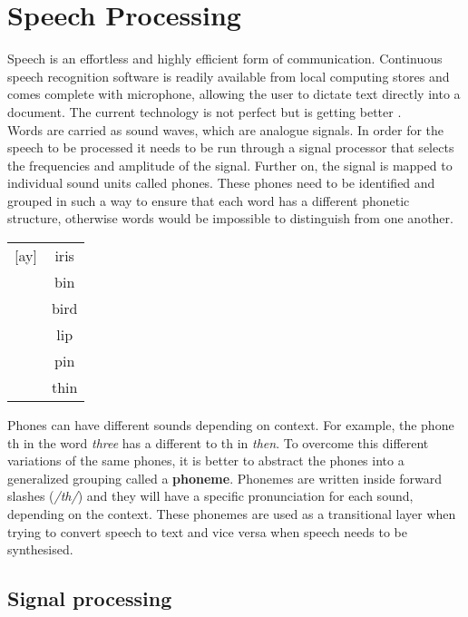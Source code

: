 \chapter{Speech Processing}\label{ch:speech_processing}

Speech is an effortless and highly efficient form of communication. Continuous speech recognition software is readily available from local computing stores and comes complete with microphone, allowing the user to dictate text directly into a document. The current technology is not perfect but is getting better \cite[p.~396]{callan2003artificial}.\\

Words are carried as sound waves, which are analogue signals. In order for the speech to be processed it needs to be run through a signal processor that selects the frequencies and amplitude of the signal. Further on, the signal is mapped to individual sound units called phones. These phones need to be identified and grouped in such a way to ensure that each word has a different phonetic structure, otherwise words would be impossible to distinguish from one another. \\

\begin{center}
\begin{tabular}{ c c  }
 [ay] & iris\\ 
 [b] & bin\\  
 [er] & bird\\
 [l] & lip\\
 [p] & pin\\
 [th] & thin
\end{tabular}
\end{center}

Phones can have different sounds depending on context. For example, the phone th in the word \textit{three} has a different to th in \textit{then}. To overcome this different variations of the same phones, it is better to abstract the phones into a generalized grouping called a \textbf{phoneme}. Phonemes are written inside forward slashes
(\textit{/th/}) and they will have a specific pronunciation for each sound, depending on the context. These phonemes are used as a transitional layer when trying to convert speech to text and vice versa when speech needs to be synthesised.\\

\section{Signal processing}

